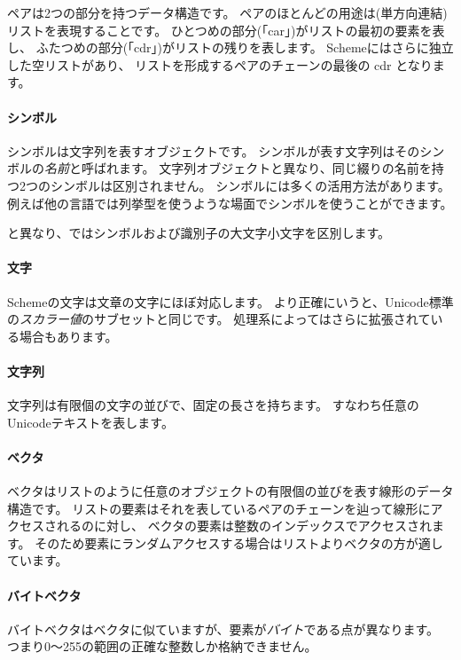 ペアは2つの部分を持つデータ構造です。
ペアのほとんどの用途は(単方向連結)リストを表現することです。
ひとつめの部分(「car」)がリストの最初の要素を表し、
ふたつめの部分(「cdr」)がリストの残りを表します。
Schemeにはさらに独立した空リストがあり、
リストを形成するペアのチェーンの最後の cdr となります。

\paragraph{シンボル}

シンボルは文字列を表すオブジェクトです。
シンボルが表す文字列はそのシンボルの\textit{名前}と呼ばれます。
文字列オブジェクトと異なり、同じ綴りの名前を持つ2つのシンボルは区別されません。
シンボルには多くの活用方法があります。
例えば他の言語では列挙型を使うような場面でシンボルを使うことができます。

\rfivers{}と異なり、\rsevenrs{}ではシンボルおよび識別子の大文字小文字を区別します。

\paragraph{文字}

Schemeの文字は文章の文字にほぼ対応します。
より正確にいうと、Unicode標準の\textit{スカラー値}のサブセットと同じです。
処理系によってはさらに拡張されている場合もあります。

\paragraph{文字列}

文字列は有限個の文字の並びで、固定の長さを持ちます。
すなわち任意のUnicodeテキストを表します。

\paragraph{ベクタ}

ベクタはリストのように任意のオブジェクトの有限個の並びを表す線形のデータ構造です。
リストの要素はそれを表しているペアのチェーンを辿って線形にアクセスされるのに対し、
ベクタの要素は整数のインデックスでアクセスされます。
そのため要素にランダムアクセスする場合はリストよりベクタの方が適しています。

\paragraph{バイトベクタ}

バイトベクタはベクタに似ていますが、要素が\textit{バイト}である点が異なります。
つまり0～255の範囲の正確な整数しか格納できません。

